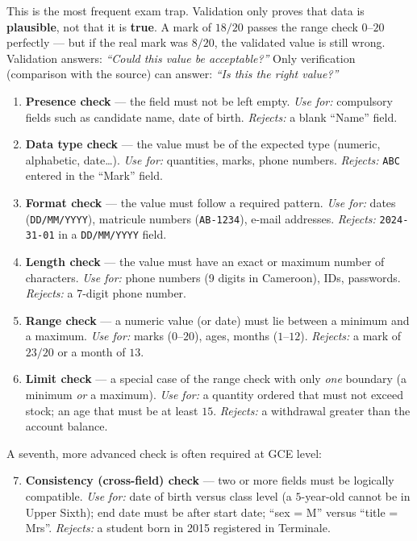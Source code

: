 \documentclass[11pt]{article}
\newcounter{popsec}
\newcounter{popsub}
\newcommand{\courssub}[1]{%
  \stepcounter{popsub}%
  \par\vspace{9pt}\noindent{\popxbold\fontsize{11.5}{13}\selectfont\color{popink}{\color{poporange}\thepopsec.\thepopsub}\hspace{6pt}#1}\par\nopagebreak\vspace{4pt}
}
\begin{document}
\begin{attention}
This is the most frequent exam trap. Validation only proves that data is \textbf{plausible}, not that it is \textbf{true}. A mark of $18/20$ passes the range check $0$--$20$ perfectly --- but if the real mark was $8/20$, the validated value is still wrong. Validation answers: \emph{``Could this value be acceptable?''} Only verification (comparison with the source) can answer: \emph{``Is this the right value?''}
\end{attention}

\courssub{The Six Standard Validation Checks}

\begin{methode}
\begin{enumerate}
\item \textbf{Presence check} --- the field must not be left empty. \emph{Use for:} compulsory fields such as candidate name, date of birth. \emph{Rejects:} a blank ``Name'' field.
\item \textbf{Data type check} --- the value must be of the expected type (numeric, alphabetic, date\ldots). \emph{Use for:} quantities, marks, phone numbers. \emph{Rejects:} \texttt{ABC} entered in the ``Mark'' field.
\item \textbf{Format check} --- the value must follow a required pattern. \emph{Use for:} dates (\texttt{DD/MM/YYYY}), matricule numbers (\texttt{AB-1234}), e-mail addresses. \emph{Rejects:} \texttt{2024-31-01} in a \texttt{DD/MM/YYYY} field.
\item \textbf{Length check} --- the value must have an exact or maximum number of characters. \emph{Use for:} phone numbers (9 digits in Cameroon), IDs, passwords. \emph{Rejects:} a 7-digit phone number.
\item \textbf{Range check} --- a numeric value (or date) must lie between a minimum and a maximum. \emph{Use for:} marks ($0$--$20$), ages, months ($1$--$12$). \emph{Rejects:} a mark of $23/20$ or a month of $13$.
\item \textbf{Limit check} --- a special case of the range check with only \emph{one} boundary (a minimum \emph{or} a maximum). \emph{Use for:} a quantity ordered that must not exceed stock; an age that must be at least $15$. \emph{Rejects:} a withdrawal greater than the account balance.
\end{enumerate}
A seventh, more advanced check is often required at GCE level:
\begin{enumerate}
\setcounter{enumi}{6}
\item \textbf{Consistency (cross-field) check} --- two or more fields must be logically compatible. \emph{Use for:} date of birth versus class level (a $5$-year-old cannot be in Upper Sixth); end date must be after start date; ``sex = M'' versus ``title = Mrs''. \emph{Rejects:} a student born in 2015 registered in Terminale.
\end{enumerate}
\end{methode}
\end{document}
